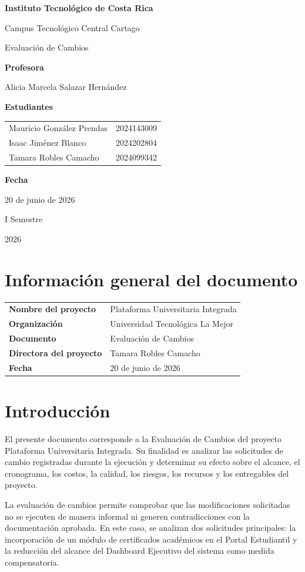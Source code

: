 \documentclass[11pt,spanish]{article}
\title{\DocumentoTitulo}
\author{\AutoresPortada}
\date{\FechaDocumento}
\makeatletter
\newcommand{\Institucion}{Instituto Tecnológico de Costa Rica}
\newcommand{\Campus}{Campus Tecnológico Central Cartago}
\newcommand{\DocumentoTitulo}{Evaluación de Cambios}
\newcommand{\Profesor}{Alicia Marcela Salazar Hernández}
\newcommand{\FechaDocumento}{20 de junio de 2026}
\newcommand{\PeriodoAcademico}{I Semestre}
\newcommand{\AnioDocumento}{2026}
\newcommand{\AutoresPortada}{%
    \begin{tabular}{l@{\hspace{1.5cm}}r}
        Mauricio González Prendas & 2024143009 \\
        Isaac Jiménez Blanco & 2024202804 \\
        Tamara Robles Camacho & 2024099342 \\
    \end{tabular}%
}
\newcommand{\MakeCover}{%
\begin{titlepage}
\thispagestyle{empty}
\centering

{\bfseries \huge \Institucion \par}
\vspace{0.25cm}
{\LARGE \Campus \par}

\vfill

{\huge \DocumentoTitulo \par}

\vfill

{\bfseries \LARGE Profesora \par}
{\Large \Profesor \par}

\vfill

{\bfseries \LARGE Estudiantes \par}
{\Large \AutoresPortada \par}

\vfill

{\bfseries\LARGE Fecha \par}
{\Large \FechaDocumento \par}

\vfill

{\LARGE \PeriodoAcademico \par}
{\LARGE \AnioDocumento \par}

\end{titlepage}%
}
\makeatother
\begin{document}
\hypersetup{pageanchor=false}

\MakeCover

\pagestyle{empty}
\tableofcontents
\clearpage
{}
\hypersetup{pageanchor=true}
\pagestyle{fancy}


\section{Información general del documento}

\begin{table}[H]
\centering
\begin{tabularx}{\textwidth}{p{5cm} Y}
\toprule
\textbf{Nombre del proyecto} & Plataforma Universitaria Integrada \\
\textbf{Organización} & Universidad Tecnológica La Mejor \\
\textbf{Documento} & \DocumentoTitulo \\
\textbf{Directora del proyecto} & Tamara Robles Camacho \\
\textbf{Fecha} & \FechaDocumento \\
\bottomrule
\end{tabularx}
\end{table}

\section{Introducción}

El presente documento corresponde a la Evaluación de Cambios del proyecto Plataforma Universitaria Integrada. Su finalidad es analizar las solicitudes de cambio registradas durante la ejecución y determinar su efecto sobre el alcance, el cronograma, los costos, la calidad, los riesgos, los recursos y los entregables del proyecto.

La evaluación de cambios permite comprobar que las modificaciones solicitadas no se ejecuten de manera informal ni generen contradicciones con la documentación aprobada. En este caso, se analizan dos solicitudes principales: la incorporación de un módulo de certificados académicos en el Portal Estudiantil y la reducción del alcance del Dashboard Ejecutivo del sistema como medida compensatoria.
\end{document}
